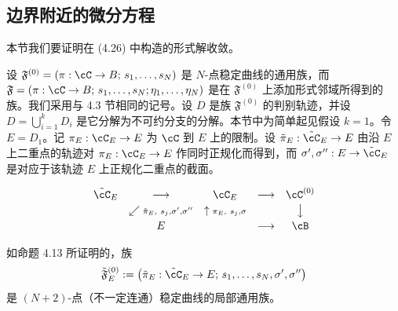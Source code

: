 
\subsection{边界附近的微分方程}

本节我们要证明在 (4.26) 中构造的形式解收敛。

设 $\mathfrak{F}^{(0)}=(\pi:\cC\to B;\,s_1,\dots,s_N)$ 是 $N$-点稳定曲线的通用族，而 $\mathfrak{F}=(\pi:\cC\to B;\,s_1,\dots,s_N;\eta_1,\dots,\eta_N)$ 是在 $\mathfrak{F}^{(0)}$ 上添加形式邻域所得到的族。我们采用与 4.3 节相同的记号。设 $D$ 是族 $\mathfrak{F}^{(0)}$ 的判别轨迹，并设 $D=\bigcup_{i=1}^k D_i$ 是它分解为不可约分支的分解。本节中为简单起见假设 $k=1$。令 $E=D_1$。记 $\pi_E:\cC_E\to E$ 为 $\cC$ 到 $E$ 上的限制。设 $\tilde\pi_E:\tilde{\cC}_E\to E$ 由沿 $E$ 上二重点的轨迹对 $\pi_E:\cC_E\to E$ 作同时正规化而得到，而 $\sigma',\sigma'':E\to\tilde{\cC}_E$ 是对应于该轨迹 $E$ 上正规化二重点的截面。


\[
\begin{array}{ccccc}
\tilde{\cC}_E & \longrightarrow & \cC_E & \longrightarrow & \cC^{(0)}\\[2pt]
& \swarrow{\scriptstyle \tilde\pi_E,\ s_j,\sigma',\sigma''}
  & \uparrow{\scriptstyle \pi_E,\ s_j,\sigma}
  & & \big\downarrow\\[2pt]
& E & & \longrightarrow & \cB
\end{array}
\]


如命题 4.13 所证明的，族
\[
\tilde{\mathfrak{F}}^{(0)}_E:=\bigl(\tilde\pi_E:\tilde{\cC}_E\to E;\,s_1,\dots,s_N,\sigma',\sigma''\bigr)
\]
是 $(N+2)$-点（不一定连通）稳定曲线的局部通用族。

